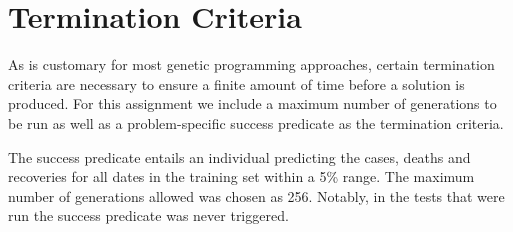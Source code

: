 \section{Termination Criteria}
As is customary for most genetic programming approaches, certain termination criteria are necessary to ensure a finite amount of time before a solution is produced. For this assignment we include a maximum number of generations to be run as well as a problem-specific success predicate as the termination criteria.

The success predicate entails an individual predicting the cases, deaths and recoveries for all dates in the training set within a 5\% range. The maximum number of generations allowed was chosen as 256. Notably, in the tests that were run the success predicate was never triggered.
